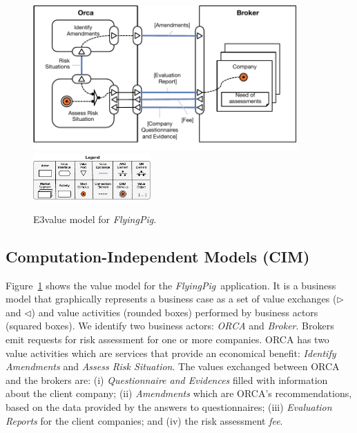\documentclass[12pt,twoside]{article}
\theoremstyle{plain}
\theoremstyle{plain}
\def\FlyingPig{\textsl{FlyingPig}\xspace}
\begin{document}
\begin{multicols}{2}
\begin{figure}
\centering
\includegraphics[width=0.9\textwidth]{3ValueModel.pdf}
\hspace*{5cm}\includegraphics[width=0.4\textwidth]{3ValueKey.pdf}
\caption{E3value model for \FlyingPig.\label{fig:E3valuemodel}}
\end{figure}

\subsection{Computation-Independent Models (CIM)}

Figure~\ref{fig:E3valuemodel} shows the value model for the \FlyingPig\ application.
It is a business model that graphically represents a business case as a set of value exchanges ($\triangleright$ and $\triangleleft$) and value activities (rounded boxes) performed by business actors (squared boxes).
We identify two business actors: \textsl{ORCA} and \textsl{Broker}.
Brokers emit requests for risk assessment for one or more companies.
ORCA has two value activities which are services that provide an economical benefit:  \textsl{Identify Amendments} and \textsl{Assess Risk Situation}.
The values exchanged between ORCA and the brokers are:
(i) \textsl{Questionnaire and Evidences} filled with information about the client company;
(ii) \textsl{Amendments} which are ORCA's rec\-om\-men\-da\-tions, based on the data provided by the answers to questionnaires;
(iii) \textsl{Evaluation Reports} for the client companies;
and
(iv) the risk assessment \textsl{fee}.


\end{multicols}
\end{document}
